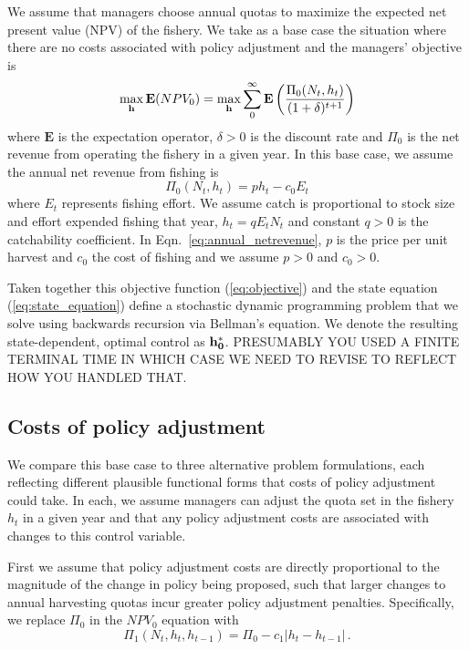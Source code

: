 \documentclass{article}\usepackage[]{graphicx}\usepackage[]{color}
\begin{document}
We assume that managers choose annual quotas to maximize the expected net present value (NPV) of the fishery. We take as a base case the situation where there are no costs associated with policy adjustment and the managers' objective is
\begin{equation}
\max_{{\bf h}}\mathbf{ E} ( NPV_{0} )=\max_{{\bf h}} \sum_0^\infty \mathbf{E} \left( \displaystyle \frac{\Pi_0(N_t,h_t)}{(1+\delta)^{t+1}} \right)
\label{eq:objective}
\end{equation}
where $\mathbf{E}$ is the expectation operator, $\delta>0$ is the discount rate and $\Pi_0$ is the net revenue from operating the fishery in a given year. In this base case, we assume the annual net revenue from fishing is 
  \begin{equation} 
    \Pi_0(N_t,h_t) = p h_t -  c_0 E_t
\label{eq:annual_netrevenue}
  \end{equation}
  where $E_t$ represents
  fishing effort. We assume catch is proportional to stock size and effort expended fishing that year, $h_t=qE_tN_t$ and constant $q>0$ is the catchability coefficient. In Eqn.~\ref{eq:annual_netrevenue}, $p$ is the price per unit harvest and $c_0$ the cost of fishing and we assume $p>0$ and $c_0>0$.

Taken together this objective function (\ref{eq:objective}) and the state equation (\ref{eq:state_equation}) define a stochastic dynamic programming problem that we solve using backwards recursion via Bellman's equation. We denote the resulting state-dependent, optimal control as ${\bf h_0^*}$. PRESUMABLY YOU USED A FINITE TERMINAL TIME IN WHICH CASE WE NEED TO REVISE TO REFLECT HOW YOU HANDLED THAT.

\subsection*{Costs of policy adjustment}
We compare this base case to three alternative problem formulations, each reflecting different plausible functional forms that costs of policy adjustment could take. In each, we assume managers can adjust the quota set in the fishery $h_t$ in a given year and that any policy adjustment costs are associated with changes to this control variable. 

First we assume that policy adjustment costs are directly proportional to the magnitude of the change in policy being proposed, such that larger changes to annual harvesting quotas incur greater policy adjustment penalties. Specifically, we replace $\Pi_0$ in the $NPV_0$ equation with 
\begin{equation}
  \Pi_{1}(N_t,h_t, h_{t-1}) = \Pi_0 - c_1  |  h_t - h_{t-1} | \,.
\end{equation}
\end{document}

